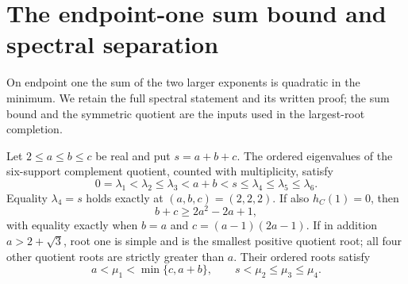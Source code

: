 \section{The endpoint-one sum bound and spectral separation}
On endpoint one the sum of the two larger exponents is quadratic in the
minimum. We retain the full spectral statement and its written proof;
the sum bound and the symmetric quotient are the inputs used in the
largest-root completion.

\begin{theorem}
\label{thm:endpoint-one-spectrum}
Let $2\leq a\leq b\leq c$ be real and put $s=a+b+c$. The ordered eigenvalues of the
six-support complement quotient, counted with multiplicity, satisfy
\[
 0=\lambda_1<\lambda_2\leq\lambda_3<a+b<s
 \leq\lambda_4\leq\lambda_5\leq\lambda_6.
\]
Equality $\lambda_4=s$ holds exactly at $(a,b,c)=(2,2,2)$.
If also $h_C(1)=0$, then
\[
 b+c\geq2a^2-2a+1,
\]
with equality exactly when $b=a$ and $c=(a-1)(2a-1)$.
If in addition $a>2+\sqrt3$, root one is
simple and is the smallest positive quotient root; all four other
quotient roots are strictly greater than $a$. Their ordered roots satisfy
\[
 a<\mu_1<\min\{c,a+b\},\qquad s<\mu_2\leq\mu_3\leq\mu_4.
\]
\end{theorem}

